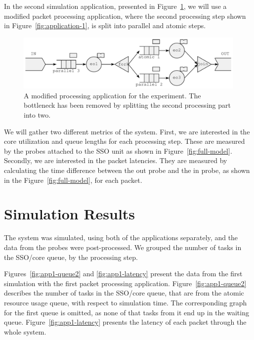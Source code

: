 In the second simulation application, presented in Figure~\ref{fig:application-2}, we will use a modified packet processing application, where the second processing step shown in Figure~\ref{fig:application-1}, is split into parallel and atomic steps.

\begin{figure}[]
  \begin{center}
    \includegraphics[width=\textwidth]{images/application-2.pdf}
    \caption{A modified processing application for the experiment. The bottleneck has been removed by splitting the second processing part into two.}
    \label{fig:application-2}
  \end{center}
\end{figure}

We will gather two different metrics of the system. First, we are interested in the core utilization and queue lengths for each processing step. These are measured by the probes attached to the SSO unit as shown in Figure~\ref{fig:full-model}. Secondly, we are interested in the packet latencies. They are measured by calculating the time difference between the out probe and the in probe, as shown in the Figure~\ref{fig:full-model}, for each packet.

\section{Simulation Results}
\label{sec:simulation-results}

The system was simulated, using both of the applications separately, and the data from the probes were post-processed. We grouped the number of tasks in the SSO/core queue, by the processing step.

Figures~\ref{fig:app1-queue2} and \ref{fig:app1-latency} present the data from the first simulation with the first packet processing application. Figure~\ref{fig:app1-queue2} describes the number of tasks in the SSO/core queue, that are from the atomic
resource usage queue, with respect to simulation time. The corresponding graph for the first queue is omitted, as none of that tasks from it end up in the waiting queue. Figure~\ref{fig:app1-latency} presents the latency of each packet through the whole system.

